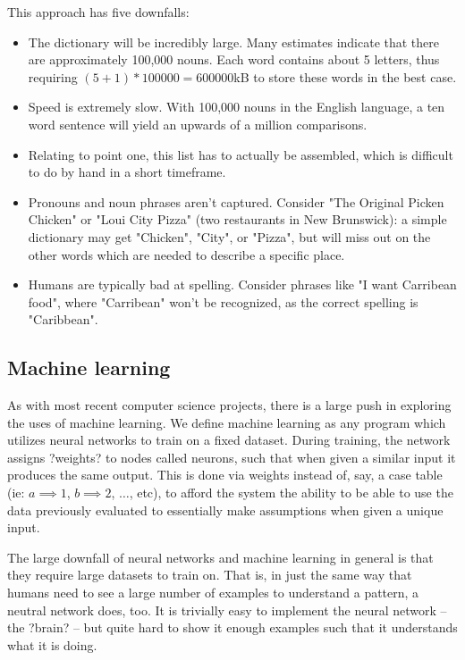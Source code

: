 \documentclass{article}
\begin{document}
        This approach has five downfalls:
        
        \begin{itemize}
            \item The dictionary will be incredibly large. Many estimates indicate that there are approximately 100,000 nouns\cite{howmanywords}. Each word 
contains about 5 letters\cite{howmanyletters}, thus requiring $(5+1)*100000=600000$kB to store these words in the best case.
            \item Speed is extremely slow. With 100,000\cite{howmanywords} nouns in the English language, a ten word sentence will yield an upwards of a million 
comparisons.
            \item Relating to point one, this list has to actually be assembled, which is difficult to do by hand in a short timeframe.
            \item Pronouns and noun phrases aren't captured. Consider "The Original Picken Chicken" or "Loui City Pizza" (two restaurants in New Brunswick): a 
simple dictionary may get "Chicken", "City", or "Pizza", but will miss out on the other words which are needed to describe a specific place.
            \item Humans are typically bad at spelling. Consider phrases like "I want Carribean food", where "Carribean" won't be recognized, as the correct 
spelling is "Caribbean".
        \end{itemize}
        
    \subsection{Machine learning}
        As with most recent computer science projects, there is a large push in exploring the uses of machine learning. We define machine learning as any 
program which utilizes neural networks to train on a fixed dataset. During training, the network assigns ?weights? to nodes called neurons, such that when given 
a similar input it produces the same output. This is done via weights instead of, say, a case table (ie: $a \implies 1$, $b \implies 2$, $\ldots$, etc), to 
afford the system the ability to be able to use the data previously evaluated to essentially make assumptions when given a unique input.

        The large downfall of neural networks and machine learning in general is that they require large datasets to train on. That is, in just the same way 
that humans need to see a large number of examples to understand a pattern, a neutral network does, too. It is trivially easy to implement the neural network -- 
the ?brain? -- but quite hard to show it enough examples such that it understands what it is doing.
\end{document}
